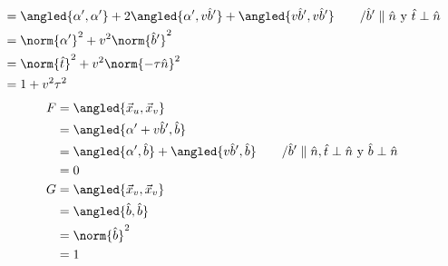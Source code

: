 \documentclass{homework}
\begin{document}
\begin{sol}
\begin{enumerate}
\begin{align*}
                    & =\angled{\alpha',\alpha'}+2\angled{\alpha',v\hat{b}'}+\angled{v\hat{b}',v\hat{b}'}\qquad/\hat{b}'\parallel \hat{n}\text{ y }\hat{t}\perp\hat{n} \\
                    & =\norm{\alpha'}^2+v^2\norm{\hat{b}'}^2                                                                                                          \\
                    & =\norm{\hat{t}}^2+v^2\norm{-\tau\hat{n}}^2                                                                                                      \\
                    & =1+v^2\tau^2                                                                                                                                    \\
              \end{align*}
              \begin{align*}
                  F & =\angled{\vec{x}_u,\vec{x}_v}                                                                                                         \\
                    & =\angled{\alpha'+v\hat{b}',\hat{b}}                                                                                                   \\
                    & =\angled{\alpha',\hat{b}}+\angled{v\hat{b}',\hat{b}}\qquad/\hat{b}'\parallel \hat{n},\hat{t}\perp\hat{n}\text{ y }\hat{b}\perp\hat{n} \\
                    & =0                                                                                                                                    \\
                  G & =\angled{\vec{x}_v,\vec{x}_v}                                                                                                         \\
                    & =\angled{\hat{b},\hat{b}}                                                                                                             \\
                    & =\norm{\hat{b}}^2                                                                                                                     \\
                    & =1                                                                                                                                    \\
              \end{align*}

\end{enumerate}
\end{sol}
\end{document}
